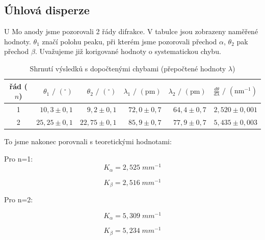 \subsection{Úhlová disperze}
U Mo anody jsme pozorovali 2 řády difrakce. V tabulce jsou zobrazeny naměřené hodnoty. $\theta_1$ značí polohu peaku, při kterém jsme pozorovali přechod $\alpha$, $\theta_2$ pak přechod $\beta$. Uvažujeme již korigované hodnoty o systematickou chybu.

\begin{table}[h!]
\centering
\caption{Shrnutí výsledků s dopočtenými chybami (přepočtené hodnoty $\lambda$)}
\begin{tabular}{c r r r r r}
\hline\hline
řád ($n$) & $\theta_1 \text{ / } (^\circ)$ & $\theta_2 \text{ / } (^\circ)$ & $\lambda_1 \text{ / } (\text{pm})$ & $\lambda_2 \text{ / } (\text{pm})$ & $\frac{d\theta}{d\lambda} \text{ / } (\text{nm}^{-1})$ \\
\hline
1 & $10,3 \pm 0,1$ & $9,2 \pm 0,1$ & $72,0 \pm 0,7$ & $64,4 \pm 0,7$ & $2,520 \pm 0,001$ \\
2 & $25,25 \pm 0,1$ & $22,75 \pm 0,1$ & $85,9 \pm 0,7$ & $77,9 \pm 0,7$ & $5,435 \pm 0,003$ \\
\hline\hline
\end{tabular}
\label{tab:vysledky_disperze}
\end{table}

To jsme nakonec porovnali s teoretickými hodnotami:

Pro n=1:
\begin{equation}
    \nonumber
    K_\alpha = 2,525 \; mm^{-1}
\end{equation}

\begin{equation}
    \nonumber
    K_\beta = 2,516 \; mm^{-1}
\end{equation}

Pro n=2:

\begin{equation}
    \nonumber
    K_\alpha = 5,309 \; mm^{-1}
\end{equation}

\begin{equation}
    \nonumber
    K_\beta = 5,234 \; mm^{-1}
\end{equation}

    
\newpage
